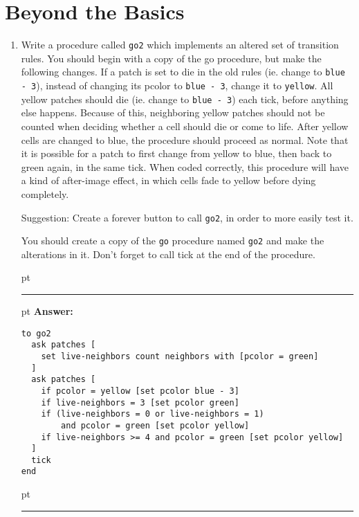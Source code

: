 \documentclass[11pt,oneside]{book}
\begin{document}
\section{Beyond the Basics}
\begin{enumerate}

\item Write a procedure called \texttt{go2} which implements an altered set of transition rules. You should begin with a copy of the go procedure, but make the following changes. If a patch is set to die in the old rules (ie. change to \texttt{blue - 3}), instead of changing its pcolor to \texttt{blue - 3}, change it to \texttt{yellow}. All yellow patches should die (ie. change to \texttt{blue - 3}) each tick, before anything else happens. Because of this, neighboring yellow patches should not be counted when deciding whether a cell should die or come to life. After yellow cells are changed to blue, the procedure should proceed as normal. Note that it is possible for a patch to first change from yellow to blue, then back to green again, in the same tick. When coded correctly, this procedure will have a kind of after-image effect, in which cells fade to yellow before dying completely.

Suggestion: Create a forever button to call \texttt{go2}, in order to more easily test it.

You should create a copy of the \texttt{go} procedure named \texttt{go2} and make the alterations in it. Don't forget to call tick at the end of the procedure.

\ifnum{}
 pt
\hrule
{} pt
{\bf Answer: }
\begin{verbatim}
to go2
  ask patches [
    set live-neighbors count neighbors with [pcolor = green]
  ]
  ask patches [
    if pcolor = yellow [set pcolor blue - 3]
    if live-neighbors = 3 [set pcolor green]
    if (live-neighbors = 0 or live-neighbors = 1) 
        and pcolor = green [set pcolor yellow]
    if live-neighbors >= 4 and pcolor = green [set pcolor yellow]
  ]
  tick
end
\end{verbatim}
 pt
\hrule
\fi


\end{enumerate}
\end{document}
